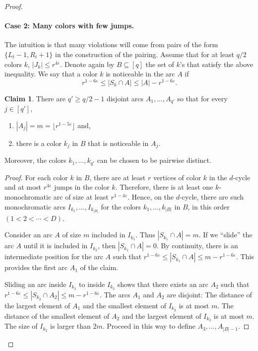 \documentclass[10pt,a4paper]{article}
\theoremstyle{definition}%
\newtheorem{claim}[theorem]{Claim}
\theoremstyle{plain}
\newcommand{\eps}{\varepsilon}
\begin{document}
\begin{proof}
\paragraph{Case 2: Many colors with few jumps.}
The intuition is that many violations will come
from pairs of the form $\{L_t - 1, R_t + 1\}$ in the construction of the pairing.
Assume that for at least $q/2$ colors $k$,
$|J_k| \leq r^{4\eps}$.
Denote again by $B \subseteq [q]$ the set of $k$’s that satisfy the above inequality. We say that a color $k$ is
noticeable in the arc $A$ if
\[
r^{1 - 6\eps} \leq |S_{k}\cap A| \leq 
|A| - r^{1-6\eps}.
\]

\begin{claim}\label{clm:noticeable}
There are $q' \geq q/2 - 1$ disjoint arcs $A_1,\ldots, A_{q'}$ so that for every $j \in [q'
]$,
\begin{enumerate}
    \item $|A_j | = m = \lfloor r^{1-5\eps}\rfloor$ and,
\item there is a color $k_j$ in $B$ that is noticeable in $A_j$.
\end{enumerate}
Moreover, the colors $k_1,\ldots, k_{q'}$ can be chosen to be pairwise distinct.
\end{claim}

\begin{proof}
For each color $k$ in $B$, there are at least $r$ vertices of color $k$ in the $d$-cycle and at most
$r^{4\eps}$ jumps in the color $k$. Therefore, there is at least one $k$-monochromatic arc of size at least
$r^{1-4\eps}$. Hence, on the $d$-cycle, there are such monochromatic arcs $I_{k_1}
,\ldots, I_{k_{|B|}}$
for the colors
$k_1,\ldots, k_{|B|}$
in $B$, in this order $(1 < 2 <\cdots< D)$.

Consider an arc $A$ of size $m$ included in $I_{k_1}$. Thus $|S_{k_1} \cap A| = m$. If we “slide” the arc $A$ until
it is included in $I_{k_2}$, then $|S_{k_1} \cap A| = 0$. By continuity, there is an intermediate position for the arc
$A$ such that $r^{1-6\eps} \leq |S_{k_1} \cap A| \leq m - r^{1-6\eps}$. This provides the first arc $A_1$ of the claim.

Sliding an arc inside $I_{k_2}$
to inside $I_{k_3}$
shows that there exists an arc $A_2$ such that $r^{1-6\eps}\leq
|S_{k_2} \cap A_2| \leq m - r^{1-6\eps}$. The arcs $A_1$ and $A_2$ are disjoint: The distance of the largest element of $A_1$
and the smallest element of $I_{k_2}$
is at most $m$. The distance of the smallest element of $A_2$ and the
largest element of $I_{k_2}$
is at most $m$. The size of $I_{k_2}$
is larger than $2m$.
Proceed in this way to define $A_3,\ldots, A_{|B|-1}$.
\end{proof}


\end{proof}
\end{document}
